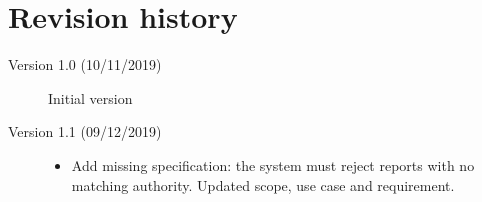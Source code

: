 \section{Revision history}
\begin{description}
    \item[Version 1.0 (10/11/2019)] Initial version
    \item[Version 1.1 (09/12/2019)]
    \begin{itemize}
        \item Add missing specification: the system must reject reports with no
        matching authority. Updated scope, use case and requirement.
    \end{itemize}  
\end{description}